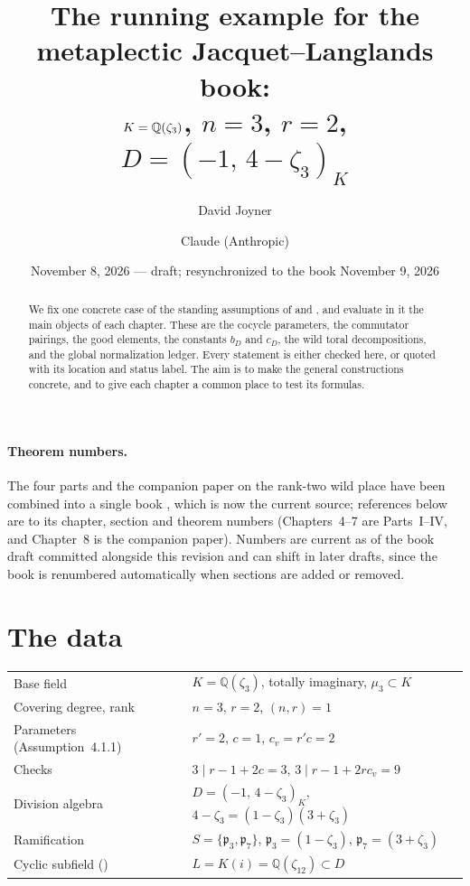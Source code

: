 \documentclass[11pt]{article}
\title{The running example for the metaplectic Jacquet--Langlands book:\\
\normalsize $K=\Q(\zeta_3)$, $n=3$, $r=2$, $D=(-1,\,4-\zeta_3)_K$}
\author{David Joyner \and Claude (Anthropic)}
\date{November 8, 2026 --- draft; resynchronized to the book November 9, 2026}
\newcommand{\Q}{\mathbb Q}
\newcommand{\p}{\mathfrak p}
\theoremstyle{definition}
\begin{document}
\maketitle

\begin{abstract}
We fix one concrete case of the standing assumptions of \cite{Book26} and
\cite{JC26}, and evaluate in it the main objects of each chapter. These are the
cocycle parameters, the commutator pairings, the good elements, the
constants $b_D$ and $c_D$, the wild toral decompositions, and the global
normalization ledger. Every statement is either checked here, or quoted
with its location and status label. The aim is to make the general
constructions concrete, and to give each chapter a common place to test its
formulas.
\end{abstract}

\paragraph{Theorem numbers.} The four parts and the companion paper on
the rank-two wild place have been combined into a single book
\cite{Book26}, which is now the current source; references below are
to its chapter, section and theorem numbers (Chapters~4--7 are Parts~I--IV,
and Chapter~8 is the companion paper). Numbers are current as of the
book draft committed alongside this revision and can shift in later
drafts, since the book is renumbered automatically when sections are
added or removed.

\section{The data}
\begin{center}
\begin{tabular}{@{}ll@{}}
\toprule
Base field & $K=\Q(\zeta_3)$, totally imaginary, $\mu_3\subset K$\\
Covering degree, rank & $n=3$, \quad $r=2$, \quad $(n,r)=1$\\
Parameters (Assumption~4.1.1) & $r'=2$, \quad $c=1$, \quad $c_v=r'c=2$\\
Checks & $3\mid r-1+2c=3$, \quad $3\mid r-1+2rc_v=9$\\
Division algebra & $D=(-1,\,4-\zeta_3)_K$, \quad $4-\zeta_3=(1-\zeta_3)(3+\zeta_3)$\\
Ramification & $S=\{\p_3,\p_7\}$, \quad $\p_3=(1-\zeta_3)$, \quad $\p_7=(3+\zeta_3)$\\
Cyclic subfield (\cite{JC26}) & $L=K(i)=\Q(\zeta_{12})\subset D$\\
\bottomrule
\end{tabular}
\end{center}
\end{document}
